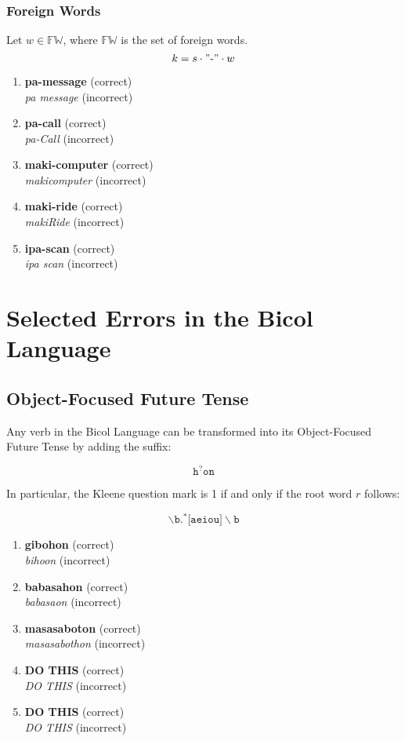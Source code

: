 \subsubsection{Foreign Words}
Let \(w \in \mathbb{FW}\), where \(\mathbb{FW}\) is the set of foreign words.
\[
      k = s \cdot "\text{-}" \cdot w
\]
\begin{example}
\end{example}
\begin{enumerate}
      \item \textbf{pa-message} (correct) \\
            \textit{pa message} (incorrect)
      \item \textbf{pa-call} (correct) \\
            \textit{pa-Call} (incorrect)
      \item \textbf{maki-computer} (correct) \\
            \textit{makicomputer} (incorrect)
      \item \textbf{maki-ride} (correct) \\
            \textit{makiRide} (incorrect)
      \item \textbf{ipa-scan} (correct) \\
            \textit{ipa scan} (incorrect)
\end{enumerate}

\section{Selected Errors in the Bicol Language}
\subsection{Object-Focused Future Tense}
Any verb in the Bicol Language can be transformed into its Object-Focused Future Tense by adding the suffix:

\[
\texttt{h}^?\texttt{on}
\]

In particular, the Kleene question mark is 1 if and only if the root word $r$ follows:

\[
    \backslash\texttt{b.}^*\texttt{[aeiou]}\backslash\texttt{b}
\]

\begin{example}
\end{example}

\begin{enumerate}
    \item \textbf{gibohon} (correct) \\
    \textit{bihoon} (incorrect)
    \item \textbf{babasahon} (correct) \\
    \textit{babasaon} (incorrect)
    \item \textbf{masasaboton} (correct) \\
    \textit{masasabothon} (incorrect)
    \item \textbf{DO THIS} (correct) \\
    \textit{DO THIS} (incorrect)
    \item \textbf{DO THIS} (correct) \\
    \textit{DO THIS} (incorrect)
\end{enumerate}

